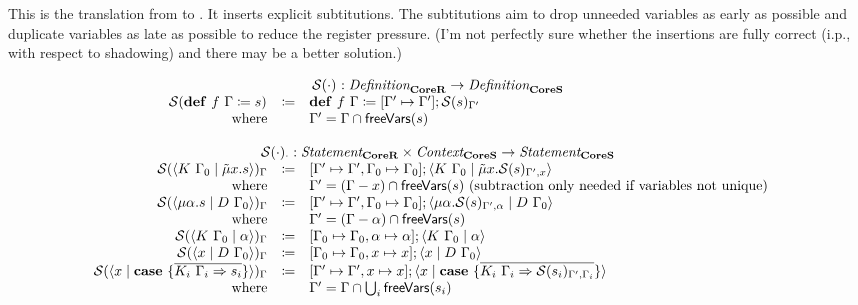 This is the translation from \targetred{} to \targetsub.
It inserts explicit subtitutions.
The subtitutions aim to drop unneeded variables as early as possible and duplicate variables as late as possible to reduce the register pressure.
(I'm not perfectly sure whether the insertions are fully correct (i.p., with respect to shadowing) and there may be a better solution.)

\[
  \begin{array}{rcll}
    \multicolumn{4}{c}{\substruct{\cdot}{} : \emph{Definition}_{\targetred{}} \rightarrow \emph{Definition}_{\targetsub{}}}\\
    \substruct{\defi{f\ \Gamma}{s}}{} & \coloneq & \defi{f\ \Gamma}{\substitute{\Gamma' \mapsto \Gamma'}{\substruct{s}{\Gamma'}}} & \\
    \text{where} &  & \Gamma' = \Gamma \cap \free{s} & \\
    \\
    \multicolumn{4}{c}{\substruct{\cdot}{\cdot} : \emph{Statement}_{\targetred{}} \times \emph{Context}_{\targetsub{}} \rightarrow \emph{Statement}_{\targetsub{}}}\\
    \substruct{\cut{K\ \Gamma_0}{\tilde{\mu}x.s}}{\Gamma} & \coloneq & \substitute{\Gamma' \mapsto \Gamma', \Gamma_0 \mapsto \Gamma_0}{\cut{K\ \Gamma_0}{\tilde{\mu}x.\substruct{s}{\Gamma', x}}} & \\
    \text{where} &  & \Gamma' = (\Gamma - x) \cap \free{s} \text{ (subtraction only needed if variables not unique)} & \\
    \substruct{\cut{\mu\alpha.s}{D\ \Gamma_0}}{\Gamma} & \coloneq & \substitute{\Gamma' \mapsto \Gamma', \Gamma_0 \mapsto \Gamma_0}{\cut{\mu\alpha.\substruct{s}{\Gamma', \alpha}}{D\ \Gamma_0}} & \\
    \text{where} &  & \Gamma' = (\Gamma - \alpha) \cap \free{s} & \\
    \substruct{\cut{K\ \Gamma_0}{\alpha}}{\Gamma} & \coloneq & \substitute{\Gamma_0 \mapsto \Gamma_0, \alpha \mapsto \alpha}{\cut{K\ \Gamma_0}{\alpha}} & \\
    \substruct{\cut{x}{D\ \Gamma_0}}{\Gamma} & \coloneq & \substitute{\Gamma_0 \mapsto \Gamma_0, x \mapsto x}{\cut{x}{D\ \Gamma_0}} & \\
    \substruct{\cut{x}{\case{\overline{K_i\ \Gamma_i \Rightarrow s_i}}}}{\Gamma} & \coloneq & \substitute{\Gamma' \mapsto \Gamma', x \mapsto x}{\cut{x}{\case{\overline{K_i\ \Gamma_i \Rightarrow \substruct{s_i}{\Gamma', \Gamma_i}}}}} & \\
    \text{where} &  & \Gamma' = \Gamma \cap \bigcup_i \free{s_i} & \\

\end{array}\]
